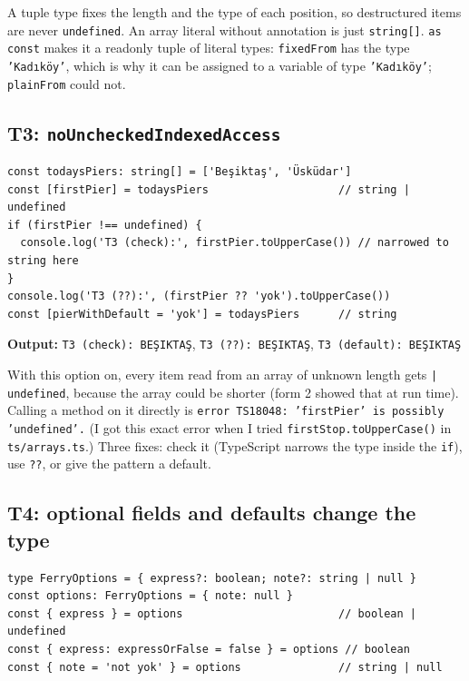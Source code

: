 \documentclass[
  10pt,
]{article}
\begin{document}
A tuple type fixes the length and the type of each position, so
destructured items are never \texttt{undefined}. An array literal
without annotation is just \texttt{string[\allowbreak{}]}.
\texttt{as const} makes it a readonly tuple of literal types:
\texttt{fixedFrom} has the type \texttt{'Kadıköy'}, which is why it can
be assigned to a variable of type \texttt{'Kadıköy'}; \texttt{plainFrom}
could not.

\hypertarget{t3-nouncheckedindexedaccess}{%
\subsection{\texorpdfstring{T3:
\texttt{noUncheckedIndexedAccess}}{T3: }}\label{t3-nouncheckedindexedaccess}}

\begin{verbatim}
const todaysPiers: string[] = ['Beşiktaş', 'Üsküdar']
const [firstPier] = todaysPiers                    // string | undefined
if (firstPier !== undefined) {
  console.log('T3 (check):', firstPier.toUpperCase()) // narrowed to string here
}
console.log('T3 (??):', (firstPier ?? 'yok').toUpperCase())
const [pierWithDefault = 'yok'] = todaysPiers      // string
\end{verbatim}

\textbf{Output:}
\texttt{T3 (\allowbreak{}check):\allowbreak{} BEŞIKTAŞ},
\texttt{T3 (\allowbreak{}??):\allowbreak{} BEŞIKTAŞ},
\texttt{T3 (\allowbreak{}default):\allowbreak{} BEŞIKTAŞ}

With this option on, every item read from an array of unknown length
gets \texttt{|\allowbreak{} undefined}, because the array could be
shorter (form 2 showed that at run time). Calling a method on it
directly is
\texttt{error TS18048:\allowbreak{} 'firstPier' is possibly 'undefined'.\allowbreak{}}
(I got this exact error when I tried
\texttt{firstStop.\allowbreak{}toUpperCase(\allowbreak{})} in
\texttt{ts/\allowbreak{}arrays.\allowbreak{}ts}.) Three fixes: check it
(TypeScript narrows the type inside the \texttt{if}), use \texttt{??},
or give the pattern a default.

\hypertarget{t4-optional-fields-and-defaults-change-the-type}{%
\subsection{T4: optional fields and defaults change the
type}\label{t4-optional-fields-and-defaults-change-the-type}}

\begin{verbatim}
type FerryOptions = { express?: boolean; note?: string | null }
const options: FerryOptions = { note: null }
const { express } = options                        // boolean | undefined
const { express: expressOrFalse = false } = options // boolean
const { note = 'not yok' } = options               // string | null
\end{verbatim}
\end{document}
